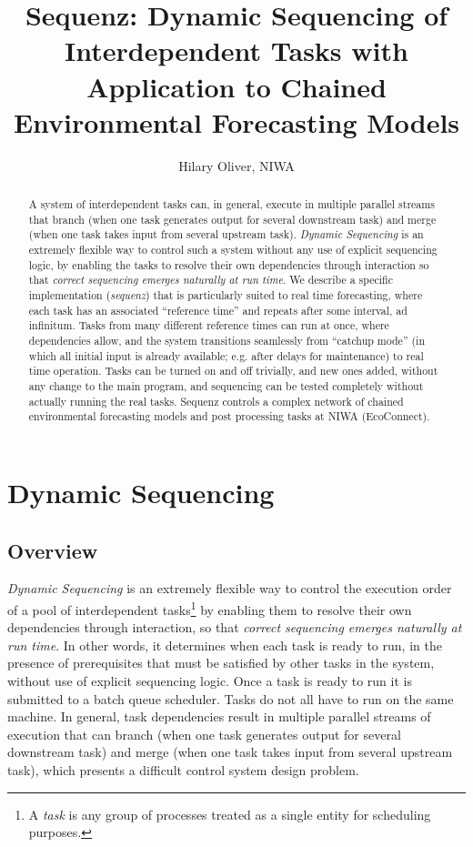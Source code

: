 \documentclass[11pt,a4paper]{article}
\title{Sequenz: \linebreak
Dynamic Sequencing of Interdependent Tasks \linebreak 
with
Application to Chained Environmental Forecasting Models}
\author{Hilary Oliver, NIWA}
\begin{document}
\maketitle
\tableofcontents

\begin{abstract}

A system of interdependent tasks can, in general, execute in multiple
parallel streams that branch (when one task generates output for several
downstream task) and merge (when one task takes input from several
upstream task). {\em Dynamic Sequencing} is an extremely flexible way to
control such a system without any use of explicit sequencing logic, by
enabling the tasks to resolve their own dependencies through interaction
so that {\em correct sequencing emerges naturally at run time}. We
describe a specific implementation ({\em sequenz}) that is particularly
suited to real time forecasting, where each task has an associated
``reference time'' and repeats after some interval, ad infinitum.  Tasks
from many different reference times can run at once, where dependencies
allow, and the system transitions seamlessly from ``catchup mode'' (in
which all initial input is already available; e.g. after delays for
maintenance) to real time operation. Tasks can be turned on and off
trivially, and new ones added, without any change to the main program,
and sequencing can be tested completely without actually running the
real tasks. Sequenz controls a complex network of chained environmental
forecasting models and post processing tasks at NIWA (EcoConnect). 

\end{abstract}


\section{Dynamic Sequencing}

\subsection{Overview}

{\em Dynamic Sequencing} is an extremely flexible way to control the
execution order of a pool of interdependent tasks\footnote{A {\em task}
is any group of processes treated as a single entity for scheduling
purposes.} by enabling them to resolve their own dependencies through
interaction, so that {\em correct sequencing emerges naturally at run
time}. In other words, it determines when each task is ready to run, in
the presence of prerequisites that must be satisfied by other tasks in
the system, without use of explicit sequencing logic. Once a task is
ready to run it is submitted to a batch queue scheduler. Tasks do not
all have to run on the same machine.  In general, task dependencies
result in multiple parallel streams of execution that can branch (when
one task generates output for several downstream task) and merge (when
one task takes input from several upstream task), which presents a
difficult control system design problem.  
\end{document}

